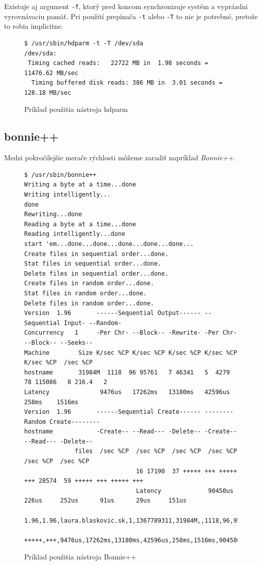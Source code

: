 Existuje aj argument \texttt{-f}, ktorý pred koncom synchronizuje systém a
vyprázdni vyrovnávaciu pamäť. Pri použití prepínača \texttt{-t} alebo
\texttt{-T} to nie je potrebné, pretože to robia implicitne.

\begin{figure}[H]
\begin{lstlisting}[label=alg:hdparm-usage]
$ /usr/sbin/hdparm -t -T /dev/sda
/dev/sda:
 Timing cached reads:   22722 MB in  1.98 seconds = 11476.62 MB/sec
  Timing buffered disk reads: 386 MB in  3.01 seconds = 128.18 MB/sec

\end{lstlisting}
\caption{Príklad použitia nástroja hdparm}
\end{figure}

%
%

\subsection*{bonnie++}

Medzi pokročilejšie merače rýchlosti môžeme zaradiť napríklad \emph{Bonnie++}.

\begin{figure}[H]
\begin{lstlisting}[label=alg:bonnie-usage]
$ /usr/sbin/bonnie++
Writing a byte at a time...done
Writing intelligently...
done
Rewriting...done
Reading a byte at a time...done
Reading intelligently...done
start 'em...done...done...done...done...done...
Create files in sequential order...done.
Stat files in sequential order...done.
Delete files in sequential order...done.
Create files in random order...done.
Stat files in random order...done.
Delete files in random order...done.
Version  1.96       ------Sequential Output------ --Sequential Input- --Random-
Concurrency   1     -Per Chr- --Block-- -Rewrite- -Per Chr- --Block-- --Seeks--
Machine        Size K/sec %CP K/sec %CP K/sec %CP K/sec %CP K/sec %CP  /sec %CP
hostname       31984M  1118  96 95761   7 46341   5  4279  78 115086   8 216.4   2
Latency              9476us   17262ms   13180ms   42596us     258ms    1516ms
Version  1.96       ------Sequential Create------ --------Random Create--------
hostname            -Create-- --Read--- -Delete-- -Create-- --Read--- -Delete--
              files  /sec %CP  /sec %CP  /sec %CP  /sec %CP  /sec %CP  /sec %CP
                               16 17190  37 +++++ +++ +++++ +++ 28574  59 +++++ +++ +++++ +++
                               Latency             90450us     226us     252us      91us      29us     151us
                               1.96,1.96,laura.blaskovic.sk,1,1367789311,31984M,,1118,96,95761,7,46341,5,4279,78,115086,8,216.4,2,16,,,,,17190,37,+++++,+++,+++++,+++,28574,59,+++++,+++,
                               +++++,+++,9476us,17262ms,13180ms,42596us,258ms,1516ms,90450us,226us,252us,91us,29us,151us
\end{lstlisting}
\caption{Príklad použitia nástroja Bonnie++}
\end{figure}


